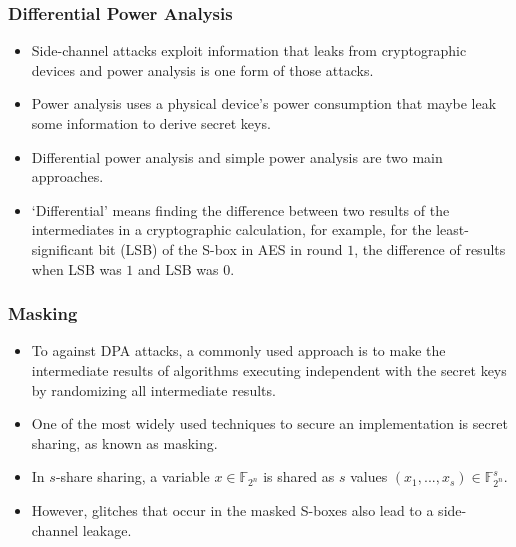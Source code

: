 \documentclass[
    aspectratio=169,                   %
]{beamer}
\newcommand{\F}{\mathbb{F}}
\begin{document}
    \begin{frame}
        \frametitle{Differential Power Analysis}
        \begin{itemize}
            \item Side-channel attacks exploit information that leaks from cryptographic devices 
            and power analysis is one form of those attacks.
            \item Power analysis uses a physical device's power consumption that maybe leak some information to derive secret keys.
            \item Differential power analysis and simple power analysis are two main approaches.
            \item `Differential' means finding the difference between two results of the intermediates in a cryptographic calculation, 
            for example, for the least-significant bit (LSB) of the S-box in AES in round $ 1 $, the difference 
            of results when LSB was $ 1 $ and LSB was $ 0 $. 
        \end{itemize}

    \end{frame}

    \begin{frame}
        \frametitle{Masking}
        \begin{itemize}
            \item To against DPA attacks, a commonly used approach is to make the intermediate results of algorithms executing independent with the secret keys by randomizing all intermediate results.
            \item One of the most widely used techniques to secure an implementation is secret sharing, 
            as known as masking.
            \item In $ s $-share sharing, a variable $ x\in\F_{2^n} $ is shared as $ s $ values 
            $ \left( x_1,...,x_s \right)\in\F_{2^n}^s $.
            \item However, glitches that occur in the masked S-boxes also lead to a side-channel leakage.  
        \end{itemize}
    \end{frame}
\end{document}

